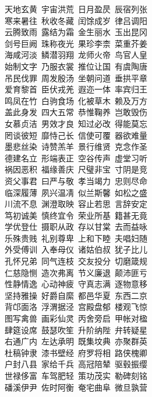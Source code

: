 天地玄黄~宇宙洪荒~日月盈昃~辰宿列张\\
寒来暑往~秋收冬藏~闰馀成岁~律吕调阳\\
云腾致雨~露结为霜~金生丽水~玉出昆冈\\
剑号巨阙~珠称夜光~果珍李柰~菜重芥姜\\
海咸河淡~鳞潜羽翔~龙师火帝~鸟官人皇\\
始制文字~乃服衣裳~推位让国~有虞陶唐\\
吊民伐罪~周发殷汤~坐朝问道~垂拱平章\\
爱育黎首~臣伏戎羌~遐迩一体~率宾归王\\
鸣凤在竹~白驹食场~化被草木~赖及万方\\
盖此身发~四大五常~恭惟鞠养~岂敢毁伤\\
女慕贞洁~男效才良~知过必改~得能莫忘\\
罔谈彼短~靡恃己长~信使可覆~器欲难量\\
墨悲丝染~诗赞羔羊~景行维贤~克念作圣\\
德建名立~形端表正~空谷传声~虚堂习听\\
祸因恶积~福缘善庆~尺璧非宝~寸阴是竞\\
资父事君~曰严与敬~孝当竭力~忠则尽命\\
临深履薄~夙兴温凊~似兰斯馨~如松之盛\\
川流不息~渊澄取映~容止若思~言辞安定\\
笃初诚美~慎终宜令~荣业所基~籍甚无竟\\
学优登仕~摄职从政~存以甘棠~去而益咏\\
乐殊贵贱~礼别尊卑~上和下睦~夫唱妇随\\
外受傅训~入奉母仪~诸姑伯叔~犹子比儿\\
孔怀兄弟~同气连枝~交友投分~切磨箴规\\
仁慈隐恻~造次弗离~节义廉退~颠沛匪亏\\
性静情逸~心动神疲~守真志满~逐物意移\\
坚持雅操~好爵自縻~都邑华夏~东西二京\\
背邙面洛~浮渭据泾~宫殿盘郁~楼观飞惊\\
图写禽兽~画彩仙灵~丙舍旁启~甲帐对楹\\
肆筵设席~鼓瑟吹笙~升阶纳陛~弁转疑星\\
右通广内~左达承明~既集坟典~亦聚群英\\
杜稿钟隶~漆书壁经~府罗将相~路侠槐卿\\
户封八县~家给千兵~高冠陪辇~驱毂振缨\\
世禄侈富~车驾肥轻~策功茂实~勒碑刻铭\\
磻溪伊尹~佐时阿衡~奄宅曲阜~微旦孰营\\
